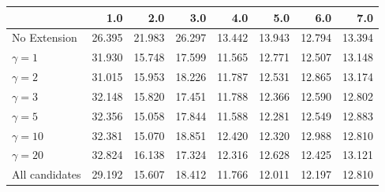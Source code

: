 \begin{tabular}{lrrrrrrr}
\toprule
{} &    1.0 &    2.0 &    3.0 &    4.0 &    5.0 &    6.0 &    7.0 \\
\midrule
No Extension   & 26.395 & 21.983 & 26.297 & 13.442 & 13.943 & 12.794 & 13.394 \\
$\gamma = 1$   & 31.930 & 15.748 & 17.599 & 11.565 & 12.771 & 12.507 & 13.148 \\
$\gamma = 2$   & 31.015 & 15.953 & 18.226 & 11.787 & 12.531 & 12.865 & 13.174 \\
$\gamma = 3$   & 32.148 & 15.820 & 17.451 & 11.788 & 12.366 & 12.590 & 12.802 \\
$\gamma = 5$   & 32.356 & 15.058 & 17.844 & 11.588 & 12.281 & 12.549 & 12.883 \\
$\gamma = 10$  & 32.381 & 15.070 & 18.851 & 12.420 & 12.320 & 12.988 & 12.810 \\
$\gamma = 20$  & 32.824 & 16.138 & 17.324 & 12.316 & 12.628 & 12.425 & 13.121 \\
All candidates & 29.192 & 15.607 & 18.412 & 11.766 & 12.011 & 12.197 & 12.810 \\
\bottomrule
\end{tabular}

